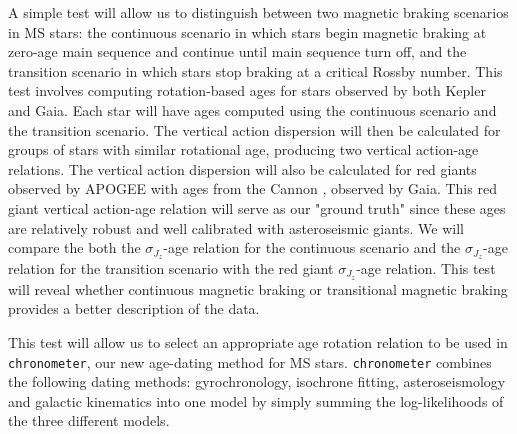 \documentclass[useAMS, usenatbib, preprint, 12pt]{aastex}
\begin{document}
A simple test will allow us to distinguish between two magnetic braking
scenarios in MS stars: the continuous scenario in which stars begin magnetic
braking at zero-age main sequence and continue until main sequence turn off,
and the transition scenario in which stars stop braking at a critical Rossby
number.
This test involves computing rotation-based ages for stars observed by both
Kepler and Gaia.
Each star will have ages computed using the continuous scenario and the
transition scenario.
The vertical action dispersion will then be calculated for groups of stars
with similar rotational age, producing two vertical action-age relations.
The vertical action dispersion will also be calculated for red giants observed
by APOGEE with ages from the Cannon \citep{Ness2015}, observed by Gaia.
This red giant vertical action-age relation will serve as our "ground truth"
since these ages are relatively robust and well calibrated with asteroseismic
giants.
We will compare the both the $\sigma_{J_z}$-age relation for the continuous
scenario and the $\sigma_{J_z}$-age relation for the transition scenario with
the red giant $\sigma_{J_z}$-age relation.
This test will reveal whether continuous magnetic braking or transitional
magnetic braking provides a better description of the data.

This test will allow us to select an appropriate age rotation relation to be
used in {\tt chronometer}, our new age-dating method for MS stars.
{\tt chronometer} combines the following dating methods: gyrochronology,
isochrone fitting, asteroseismology and galactic kinematics into one model by
simply summing the log-likelihoods of the three different models.
\end{document}
